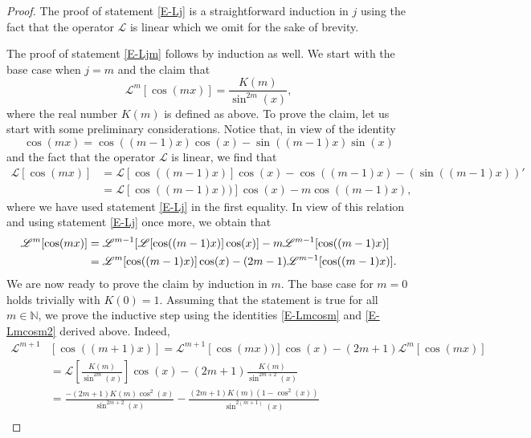 \documentclass[12pt,psamsfonts]{amsart}
\begin{document}
\begin{proof}
The proof of statement \eqref{E-Lj} is a straightforward  induction in $j$ using the
fact that the
operator ${\mathscr{L}}$ is linear which we omit for the sake of brevity.

The  proof of statement \eqref{E-Ljm} follows by induction as well. We start
with the base case when $j=m$ and the claim that
\begin{equation}
\label{E-Lmcosm}
          {\mathscr{L}}^m[\cos(mx)] = \frac{K(m)}{\sin^{2m}(x)},
\end{equation}
where the real number $K(m)$ is defined as above. To prove the claim, let us start with some
preliminary considerations. Notice that, in view of the identity $$\cos(mx)=\cos((m-1)x)\cos(x)
- \sin((m-1)x)\sin(x)$$ and the fact that the operator ${\mathscr{L}}$ is linear, we find that
\begin{align*}
    {\mathscr{L}}[\cos(mx)] &= {\mathscr{L}}[\cos((m-1)x)]\cos(x)-\cos((m-1)x)-\left(\sin((m-1)x)\right)'\\
                        &= {\mathscr{L}}[\cos((m-1)x))]\cos(x)-m\cos((m-1)x),
\end{align*}
where we have used statement \eqref{E-Lj} in the first equality. In view of this relation and
using statement \eqref{E-Lj} once more, we obtain that
\begin{align}
\label{E-Lmcosm2}
    {\mathscr{L}}^m[\cos(mx)] &= {\mathscr{L}}^{m-1}[{\mathscr{L}}[\cos((m-1)x)]\cos(x)] - m {\mathscr{L}}^{m-1}[\cos((m-1)x)]\notag\\
                             &= {\mathscr{L}}^m[\cos((m-1)x)]\cos(x)-(2m-1){\mathscr{L}}^{m-1}[\cos((m-1)x)].
\end{align}
We are now ready to prove the claim by induction in $m$. The base case for $m=0$ holds trivially
with $K(0)=1$. Assuming that the statement is true for all $m\in{\mathbb{N}}$, we prove the inductive step
using the identities \eqref{E-Lmcosm} and \eqref{E-Lmcosm2} derived above. Indeed,
\begin{align*}
    {\mathscr{L}}^{m+1}&[\cos((m+1)x)] = {\mathscr{L}}^{m+1}[\cos(mx))]\cos(x)-(2m+1){\mathscr{L}}^m[\cos(mx)] \\
                                          &= {\mathscr{L}}\left[ \frac{K(m)}{\sin^{2m}(x)}\right] \cos(x)
                                                -(2m+1) \frac{K(m)}{\sin^{2m+2}(x)}\\
                                          &= \frac{-(2m+1)K(m)\cos^2(x)}{\sin^{2m+2}(x)}
                                               -\frac{(2m+1) K(m)(1-\cos^2(x))}{\sin^{2(m+1)}(x)}\\

\end{align*}
\end{proof}
\end{document}
